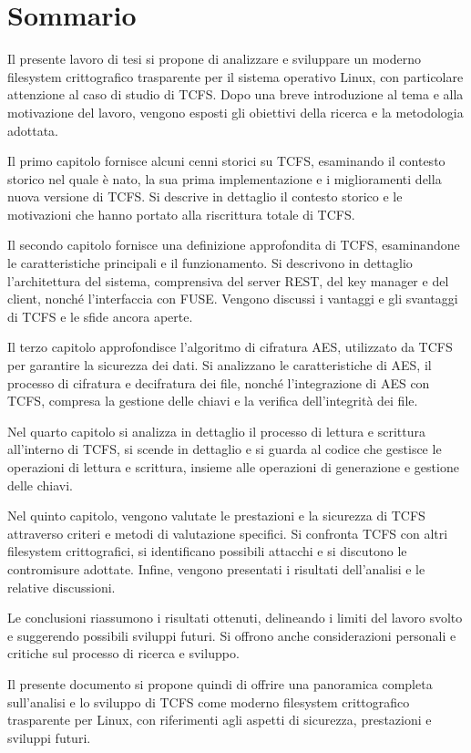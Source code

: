 \chapter*{Sommario}

Il presente lavoro di tesi si propone di analizzare e sviluppare un moderno filesystem crittografico trasparente per il sistema operativo Linux, con particolare attenzione al caso di studio di TCFS. Dopo una breve introduzione al tema e alla motivazione del lavoro, vengono esposti gli obiettivi della ricerca e la metodologia adottata.

Il primo capitolo fornisce alcuni cenni storici su TCFS, esaminando il contesto storico nel quale è nato, la sua prima implementazione e i miglioramenti della nuova versione di TCFS. Si descrive in dettaglio il contesto storico e le motivazioni che hanno portato alla riscrittura totale di TCFS.

Il secondo capitolo fornisce una definizione approfondita di TCFS, esaminandone le caratteristiche principali e il funzionamento. Si descrivono in dettaglio l'architettura del sistema, comprensiva del server REST, del key manager e del client, nonché l'interfaccia con FUSE. Vengono discussi i vantaggi e gli svantaggi di TCFS e le sfide ancora aperte.

Il terzo capitolo approfondisce l'algoritmo di cifratura AES, utilizzato da TCFS per garantire la sicurezza dei dati. Si analizzano le caratteristiche di AES, il processo di cifratura e decifratura dei file, nonché l'integrazione di AES con TCFS, compresa la gestione delle chiavi e la verifica dell'integrità dei file.

Nel quarto capitolo si analizza in dettaglio il processo di lettura e scrittura all'interno di TCFS, si scende in dettaglio e si guarda al codice che gestisce le operazioni di lettura e scrittura, insieme alle operazioni di generazione e gestione delle chiavi.

Nel quinto capitolo, vengono valutate le prestazioni e la sicurezza di TCFS attraverso criteri e metodi di valutazione specifici. Si confronta TCFS con altri filesystem crittografici, si identificano possibili attacchi e si discutono le contromisure adottate. Infine, vengono presentati i risultati dell'analisi e le relative discussioni.

Le conclusioni riassumono i risultati ottenuti, delineando i limiti del lavoro svolto e suggerendo possibili sviluppi futuri. Si offrono anche considerazioni personali e critiche sul processo di ricerca e sviluppo.

Il presente documento si propone quindi di offrire una panoramica completa sull'analisi e lo sviluppo di TCFS come moderno filesystem crittografico trasparente per Linux, con riferimenti agli aspetti di sicurezza, prestazioni e sviluppi futuri.
